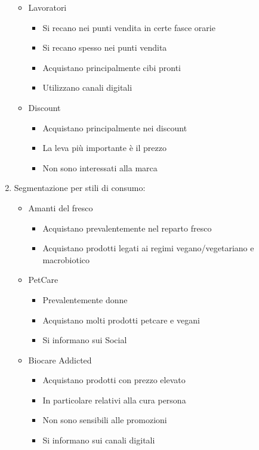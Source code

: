 \documentclass[11pt]{article}
\begin{document}
\begin{enumerate}[topsep=0ex]
\begin{itemize}[topsep=0ex,noitemsep]
\begin{itemize}[topsep=0ex,noitemsep]
		\end{itemize}
		\item Lavoratori
		\begin{itemize}[noitemsep,topsep=0ex]
			\item Si recano nei punti vendita in certe fasce orarie
			\item Si recano spesso nei punti vendita
			\item Acquistano principalmente cibi pronti
			\item Utilizzano canali digitali
		\end{itemize}
		\item Discount
		\begin{itemize}[noitemsep,topsep=0ex]
			\item Acquistano principalmente nei discount
			\item La leva più importante è il prezzo
			\item Non sono interessati alla marca
		\end{itemize}
	\end{itemize}
	\item Segmentazione per stili di consumo:
	\begin{itemize}[noitemsep,topsep=0ex]
		\item Amanti del fresco
		\begin{itemize}[noitemsep,topsep=0ex]
			\item Acquistano prevalentemente nel reparto fresco
			\item Acquistano prodotti legati ai regimi vegano/vegetariano e macrobiotico
		\end{itemize}
		\item PetCare 
		\begin{itemize}[noitemsep,topsep=0ex]
			\item Prevalentemente donne
			\item Acquistano molti prodotti petcare e vegani
			\item Si informano sui Social
		\end{itemize}
		\item Biocare Addicted
		\begin{itemize}[noitemsep,topsep=0ex]
			\item Acquistano prodotti con prezzo elevato
			\item In particolare relativi alla cura persona
			\item Non sono sensibili alle promozioni
			\item Si informano sui canali digitali
		\end{itemize}
	\end{itemize} 
\end{enumerate}
\end{document}
